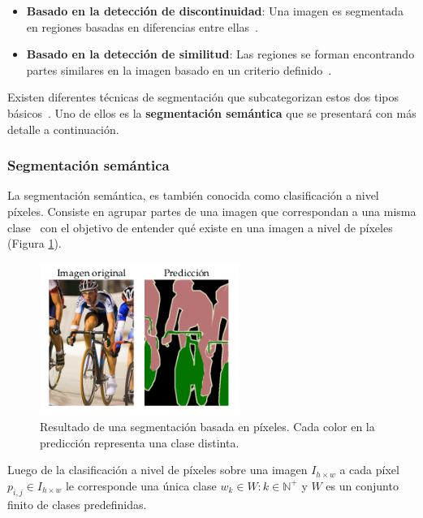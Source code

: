 \begin{itemize}
	\item \textbf{Basado en la detección de discontinuidad}: Una imagen es segmentada en regiones basadas en diferencias entre ellas~\cite{sundararajan2017digital}.
	\item \textbf{Basado en la detección de similitud}: Las regiones se forman encontrando partes similares en la imagen basado en un criterio definido~\cite{sundararajan2017digital}.
\end{itemize}

Existen diferentes técnicas de segmentación que subcategorizan estos dos tipos básicos~\cite{anjna2017review}. Uno de ellos es la \textbf{segmentación semántica} que se presentará con más detalle a continuación.

\subsubsection{Segmentación semántica}

La segmentación semántica, es también conocida como clasificación a nivel píxeles. Consiste en agrupar partes de una imagen que correspondan a una misma clase~\cite{thoma2016survey} con el objetivo de entender qué existe en una imagen a nivel de píxeles (Figura \ref{fig:semseg}).

\begin{figure}[h!]
	\centering
	\includegraphics[width=6.5cm]{./Graphics/semseg.png}
	\caption{Resultado de una segmentación basada en píxeles. Cada color en la predicción representa una clase distinta.}
	\label{fig:semseg}
\end{figure}

\begin{property}
	Luego de la clasificación a nivel de píxeles sobre una imagen $I_{h \times w}$ a cada píxel $p_{i, j} \in I_{h \times w}$ le corresponde una única clase $w_k \in W: k \in \mathbb{N}^+$ y $W$ es un conjunto finito de clases predefinidas.
\end{property}

